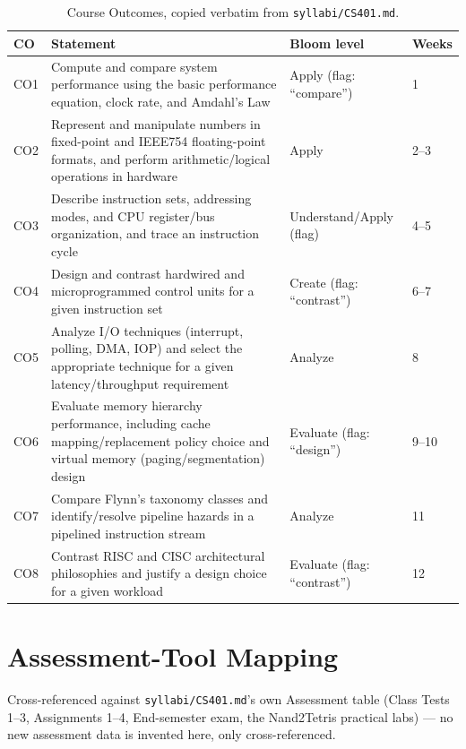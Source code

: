 \documentclass[11pt]{article}
\begin{document}
\begin{table}[h]
\centering
\small
\begin{tabular}{@{}p{0.8cm} p{7.6cm} p{3.6cm} p{1.6cm}@{}}
\toprule
CO & Statement & Bloom level & Weeks \\
\midrule
CO1 & Compute and compare system performance using the basic performance equation, clock rate, and Amdahl's Law & Apply (flag: ``compare'') & 1 \\
CO2 & Represent and manipulate numbers in fixed-point and IEEE754 floating-point formats, and perform arithmetic/logical operations in hardware & Apply & 2--3 \\
CO3 & Describe instruction sets, addressing modes, and CPU register/bus organization, and trace an instruction cycle & Understand/Apply (flag) & 4--5 \\
CO4 & Design and contrast hardwired and microprogrammed control units for a given instruction set & Create (flag: ``contrast'') & 6--7 \\
CO5 & Analyze I/O techniques (interrupt, polling, DMA, IOP) and select the appropriate technique for a given latency/throughput requirement & Analyze & 8 \\
CO6 & Evaluate memory hierarchy performance, including cache mapping/replacement policy choice and virtual memory (paging/segmentation) design & Evaluate (flag: ``design'') & 9--10 \\
CO7 & Compare Flynn's taxonomy classes and identify/resolve pipeline hazards in a pipelined instruction stream & Analyze & 11 \\
CO8 & Contrast RISC and CISC architectural philosophies and justify a design choice for a given workload & Evaluate (flag: ``contrast'') & 12 \\
\bottomrule
\end{tabular}
\caption{Course Outcomes, copied verbatim from \texttt{syllabi/CS401.md}.}
\label{tab:co}
\end{table}

\section{Assessment-Tool Mapping}

Cross-referenced against \texttt{syllabi/CS401.md}'s own Assessment table (Class Tests 1--3, Assignments 1--4, End-semester exam, the Nand2Tetris practical labs) --- no new assessment data is invented here, only cross-referenced.
\end{document}
